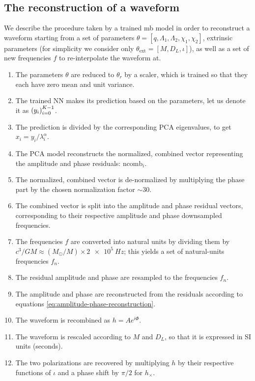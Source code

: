 \documentclass[main.tex]{subfiles}
\begin{document}
\subsection{The reconstruction of a waveform}

We describe the procedure taken by a trained \ac{mb} model in order to reconstruct a waveform starting from a set of parameters \(\theta = [q, \Lambda_1 , \Lambda_2 , \chi_1 , \chi_2 ]\), extrinsic parameters (for simplicity we consider only \(\theta _{\text{ext}} = [M, D_L, \iota]\)), as well as a set of new frequencies \(f\) to re-interpolate the waveform at.

\begin{enumerate}
    \item The parameters \(\theta \) are reduced to \(\theta _r\) by a scaler, which is trained so that they each have zero mean and unit variance. 
    \item The trained \ac{NN} makes its prediction based on the parameters, let us denote it as \(\qty(y_i)_{i=0}^{K-1}\).
    \item The prediction is divided by the corresponding \ac{PCA} eigenvalues, to get \(x_i = y_i / \lambda _i^{\alpha }\).
    \item The \ac{PCA} model reconstructs the normalized, combined vector representing the amplitude and phase residuals: \(\text{ncomb}_i\). 
    \item The normalized, combined vector is de-normalized by multiplying the phase part by the chosen normalization factor \(\sim 30\).
    \item The combined vector is split into the amplitude and phase residual vectors, corresponding to their respective amplitude and phase downsampled frequencies.
    \item The frequencies \(f\) are converted into natural units by dividing them by \(c^3 / GM \approx (M_{\odot} / M) \times  \SI{2e5}{Hz}\); this yields a set of natural-units frequencies \(f_n\). 
    \item The residual amplitude and phase are resampled to the frequencies \(f_n\).
    \item The amplitude and phase are reconstructed from the residuals according to equations \eqref{eq:amplitude-phase-reconstruction}.
    \item The waveform is recombined as \(h = A e^{i \Phi }\).
    \item The waveform is rescaled according to \(M\) and \(D_L\), so that it is expressed in SI units (seconds).
    \item The two polarizations are recovered by multiplying \(h\) by their respective functions of \(\iota \) and a phase shift by \(\pi /2\) for \(h_ \times \). 
\end{enumerate}
\end{document}
